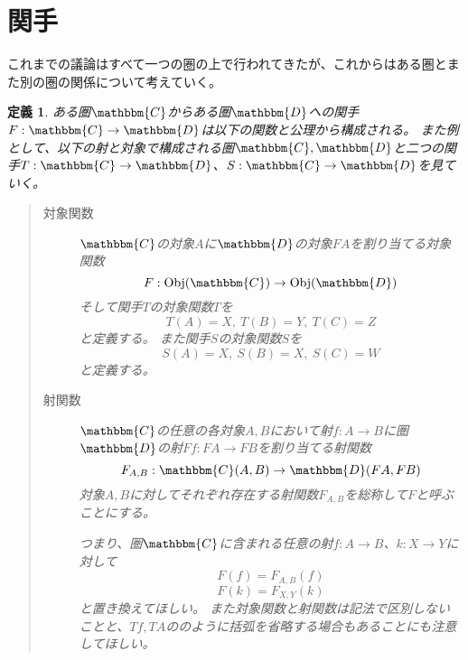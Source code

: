 \documentclass[dvipdfmx]{jsarticle}
\newcommand{\cat}[1]{\mathbbm{#1}}
\newcommand{\arrow}{\rightarrow}
\newcommand{\functor}[3]{#1:\cat{#2}\arrow \cat{#3}}
\newcommand{\obj}[1]{\mathrm{Obj}(\cat{#1})}
\newcommand{\mor}[3]{#1:#2\arrow #3}
\newcommand{\arset}[3]{\cat{#1}(#2,#3)}
\newtheorem{define}{定義}[section]
\numberwithin{proof}{subsection}
\numberwithin{prop}{subsection}
\numberwithin{define}{subsection}
\begin{document}
	\section{関手}
	これまでの議論はすべて一つの圏の上で行われてきたが、これからはある圏とまた別の圏の関係について考えていく。
	\begin{define}
		ある圏$\cat{C}$からある圏$\cat{D}$への関手$\functor{F}{C}{D}$は以下の関数と公理から構成される。
		また例として、以下の射と対象で構成される圏$\cat{C},\cat{D}$と二つの関手$\functor{T}{C}{D}$、$\functor{S}{C}{D}$を見ていく。
		\begin{center}
		\end{center}
		\begin{quote}
			\begin{description}
		\item[対象関数]$\cat{C}$の対象$A$に$\cat{D}$の対象$FA$を割り当てる対象関数\[\mor{F}{\obj{C}}{\obj{D}}\]
		そして関手$T$の対象関数$T$を\[T(A)=X,\ T(B)=Y,\ T(C)=Z\]と定義する。
		また関手$S$の対象関数$S$を\[S(A)=X,\ S(B)=X,\ S(C)=W\]と定義する。
		\item[射関数]$\cat{C}$の任意の各対象$A,B$において射$\mor{f}{A}{B}$に圏$\cat{D}$の射$\mor{Ff}{FA}{FB}$を割り当てる射関数\[\mor{F_{A,B}}{\arset{C}{A}{B}}{\arset{D}{FA}{FB}}\]対象$A,B$に対してそれぞれ存在する射関数$F_{A,B}$を総称して$F$と呼ぶことにする。

		つまり、圏$\cat{C}$に含まれる任意の射$\mor{f}{A}{B}$、$\mor{k}{X}{Y}$に対して\[F(f)=F_{A,B}(f)\]\[F(k)=F_{X,Y}(k)\]と置き換えてほしい。
		また対象関数と射関数は記法で区別しないことと、$Tf,TA$ののように括弧を省略する場合もあることにも注意してほしい。


\end{description}
\end{quote}
\end{define}
\end{document}
